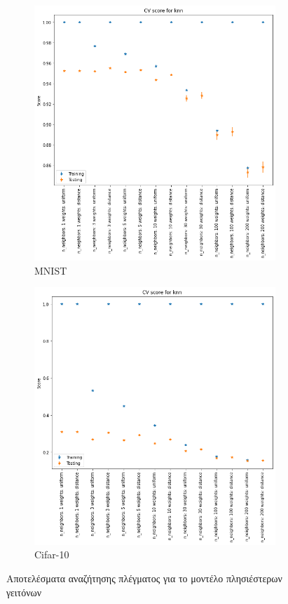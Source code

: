 \documentclass[a4paper]{article}
\begin{document}
\begin{figure}[H]
    \centering

    \begin{subfigure}[t]{0.45\linewidth}
    \includegraphics[width=\linewidth]{figures/mnist/cv_results_knn.png}
    \caption{MNIST}
    \end{subfigure}
    \begin{subfigure}[t]{0.45\linewidth}
    \includegraphics[width=\linewidth]{figures/cifar/cv_results_knn.png}
    \caption{Cifar-10}
    \end{subfigure}

    \caption{Αποτελέσματα αναζήτησης πλέγματος για το μοντέλο πλησιέστερων
    γειτόνων}
    \label{fig:cv_knn}
\end{figure}
\end{document}
